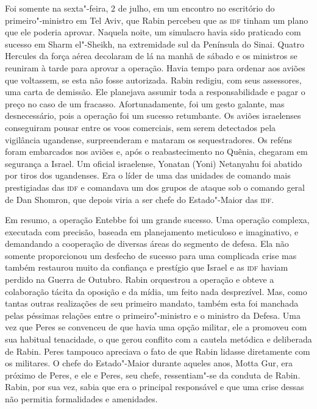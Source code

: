 Foi somente na sexta"-feira, 2 de julho, em um encontro no escritório do
primeiro"-ministro em Tel Aviv, que Rabin percebeu que as \textsc{idf} tinham um
plano que ele poderia aprovar. Naquela noite, um simulacro
havia sido praticado com sucesso em Sharm el"-Sheikh, na extremidade sul
da Península do Sinai. Quatro Hercules da força aérea decolaram de lá na
manhã de sábado e os ministros se reuniram à tarde para aprovar a
operação. Havia tempo para ordenar aos aviões que voltassem, se esta não
fosse autorizada. Rabin redigiu, com seus assessores, uma carta de
demissão. Ele planejava assumir toda a responsabilidade e pagar o preço
no caso de um fracasso. Afortunadamente, foi um gesto galante, mas
desnecessário, pois a operação foi um sucesso retumbante. Os aviões
israelenses conseguiram pousar entre os voos comerciais, sem serem
detectados pela vigilância ugandense, surpreenderam e mataram os
sequestradores. Os reféns foram embarcados nos aviões e, após o
reabastecimento no Quênia, chegaram em segurança a Israel. Um oficial
israelense, Yonatan (Yoni) Netanyahu foi abatido por tiros dos
ugandenses. Era o líder de uma das unidades de comando mais prestigiadas
das \textsc{idf} e comandava um dos grupos de ataque sob o comando geral de Dan
Shomron, que depois viria a ser chefe do Estado"-Maior das \textsc{idf}.

Em resumo, a operação Entebbe foi um grande sucesso. Uma operação
complexa, executada com precisão, baseada em planejamento meticuloso e
imaginativo, e demandando a cooperação de diversas áreas do segmento de
defesa. Ela não somente proporcionou um desfecho de sucesso para uma
complicada crise mas também restaurou muito da confiança e prestígio
que Israel e as \textsc{idf} haviam perdido na Guerra de Outubro. Rabin
orquestrou a operação e obteve a colaboração tácita da oposição e da
mídia, um feito nada desprezível. Mas, como tantas outras realizações de
seu primeiro mandato, também esta foi manchada pelas péssimas relações
entre o primeiro"-ministro e o ministro da Defesa. Uma vez que Peres se
convenceu de que havia uma opção militar, ele a promoveu com sua
habitual tenacidade, o que gerou conflito com a cautela metódica e
deliberada de Rabin. Peres tampouco apreciava o fato de que Rabin
lidasse diretamente com os militares. O chefe do Estado"-Maior durante
aqueles anos, Motta Gur, era próximo de Peres, e ele e Peres, seu chefe,
ressentiam"-se da conduta de Rabin. Rabin, por sua vez, sabia que era o
principal responsável e que uma crise dessas não permitia formalidades e
amenidades.

